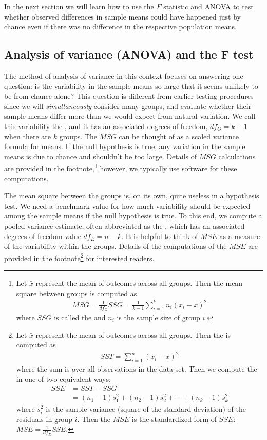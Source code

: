 In the next section we will learn how to use the $F$ statistic and ANOVA to test whether observed differences in sample means could have happened just by chance even if there was no difference in the respective population means.


\subsection{Analysis of variance (ANOVA) and the F test}

The method of analysis of variance in this context focuses on answering one question: is the variability in the sample means so large that it seems unlikely to be from chance alone? This question is different from earlier testing procedures since we will \emph{simultaneously} consider many groups, and evaluate whether their sample means differ more than we would expect from natural variation. We call this variability the , and it has an associated degrees of freedom, $df_{G}=k-1$ when there are $k$ groups. The $MSG$ can be thought of as a scaled variance formula for means. If the null hypothesis is true, any variation in the sample means is due to chance and shouldn't be too large. Details of $MSG$ calculations are provided in the footnote,\footnote{Let $\bar{x}$ represent the mean of outcomes across all groups. Then the mean square between groups is computed as
\begin{align*}
MSG = \frac{1}{df_{G}}SSG = \frac{1}{k-1}\sum_{i=1}^{k} n_{i}\left(\bar{x}_{i} - \bar{x}\right)^2
\end{align*}
where $SSG$ is called the  and $n_{i}$ is the sample size of group $i$.} however, we typically use software for these computations.

The mean square between the groups is, on its own, quite useless in a hypothesis test. We need a benchmark value for how much variability should be expected among the sample means if the null hypothesis is true. To this end, we compute a pooled variance estimate, often abbreviated as the , which has an associated degrees of freedom value $df_E=n-k$. It is helpful to think of $MSE$ as a measure of the variability within the groups. Details of the computations of the $MSE$ are provided in the footnote\footnote{Let $\bar{x}$ represent the mean of outcomes across all groups. Then the  is computed as
\begin{align*}
SST = \sum_{i=1}^{n} \left(x_{i} - \bar{x}\right)^2
\end{align*}
where the sum is over all observations in the data set. Then we compute the  in one of two equivalent ways:
\begin{align*}
SSE &= SST - SSG \\
	&= (n_1-1)s_1^2 + (n_2-1)s_2^2 + \cdots + (n_k-1)s_k^2
\end{align*}
where $s_i^2$ is the sample variance (square of the standard deviation) of the residuals in group $i$. Then the $MSE$ is the standardized form of $SSE$: $MSE = \frac{1}{df_{E}}SSE$.} for interested readers.

